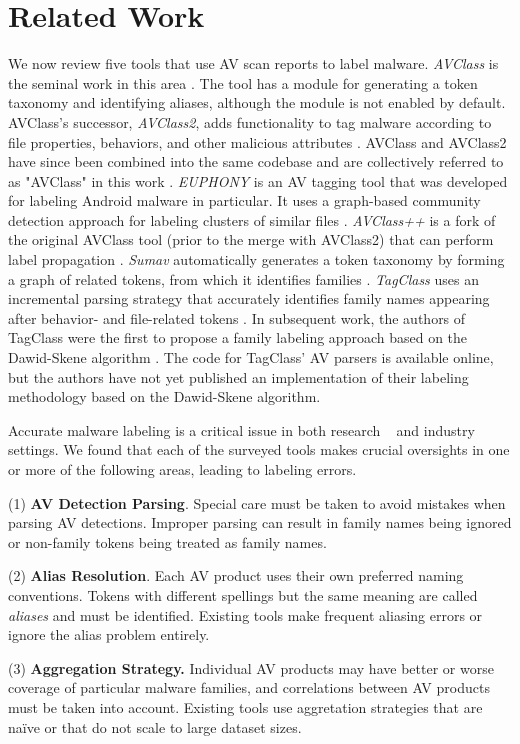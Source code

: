 \section{Related Work}
\label{sec:related_work}

We now review five tools that use AV scan reports to label malware. \textit{AVClass} is the seminal work in this area \cite{avclass}. The tool has a module for generating a token taxonomy and identifying aliases, although the module is not enabled by default. AVClass's successor, \textit{AVClass2}, adds functionality to tag malware according to file properties, behaviors, and other malicious attributes \cite{avclass2}. AVClass and AVClass2 have since been combined into the same codebase and are collectively referred to as "AVClass" in this work \cite{avclassgithub}. \textit{EUPHONY} is an AV tagging tool that was developed for labeling Android malware in particular. It uses a graph-based community detection approach for labeling clusters of similar files \cite{euphony}. \textit{AVClass++} is a fork of the original AVClass tool (prior to the merge with AVClass2) that can perform label propagation \cite{avclassplusplus}. \textit{Sumav} automatically generates a token taxonomy by forming a graph of related tokens, from which it identifies families \cite{sumav}. \textit{TagClass} uses an incremental parsing strategy that accurately identifies family names appearing after behavior- and file-related tokens \cite{tagclass}. In subsequent work, the authors of TagClass were the first to propose a family labeling approach based on the Dawid-Skene algorithm \cite{dawid-skene, tagclass_DS}.
The code for TagClass' AV parsers is available online, but the authors have not yet published an implementation of their labeling methodology based on the Dawid-Skene algorithm.

Accurate malware labeling is a critical issue in both research ~\cite{TirthCAMLIS} and industry ~\cite{10.1145/3097983.3098196} settings. We found that each of the surveyed tools makes crucial oversights in one or more of the following areas, leading to labeling errors.

    (1) \textbf{AV Detection Parsing}. Special care must be taken to avoid mistakes when parsing AV detections. Improper parsing can result in family names being ignored or non-family tokens being treated as family names.
    
    (2)  \textbf{Alias Resolution}. Each AV product uses their own preferred naming conventions. Tokens with different spellings but the same meaning are called \emph{aliases} and must be identified. Existing tools make frequent aliasing errors or ignore the alias problem entirely. 
    
    (3) \textbf{Aggregation Strategy.} Individual AV products may have better or worse coverage of particular malware families, and correlations between AV products must be taken into account. Existing tools use aggretation strategies that are na\"ive or that do not scale to large dataset sizes.
